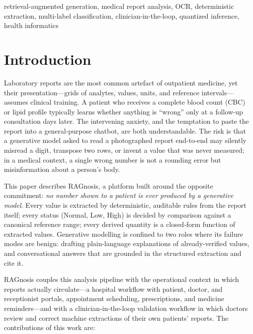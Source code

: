 \documentclass[conference]{IEEEtran}
\begin{document}
\begin{IEEEkeywords}
retrieval-augmented generation, medical report analysis, OCR,
deterministic extraction, multi-label classification, clinician-in-the-loop,
quantized inference, health informatics
\end{IEEEkeywords}

\section{Introduction}
Laboratory reports are the most common artefact of outpatient medicine,
yet their presentation---grids of analytes, values, units, and reference
intervals---assumes clinical training. A patient who receives a complete
blood count (CBC) or lipid profile typically learns whether anything is
``wrong'' only at a follow-up consultation days later. The intervening
anxiety, and the temptation to paste the report into a general-purpose
chatbot, are both understandable. The risk is that a generative model
asked to read a photographed report end-to-end may silently misread a
digit, transpose two rows, or invent a value that was never measured;
in a medical context, a single wrong number is not a rounding error but
misinformation about a person's body.

This paper describes RAGnosis, a platform built around the opposite
commitment: \emph{no number shown to a patient is ever produced by a
generative model}. Every value is extracted by deterministic,
auditable rules from the report itself; every status (Normal, Low,
High) is decided by comparison against a canonical reference range;
every derived quantity is a closed-form function of extracted values.
Generative modelling is confined to two roles where its failure modes
are benign: drafting plain-language explanations of already-verified
values, and conversational answers that are grounded in the structured
extraction and cite it.

RAGnosis couples this analysis pipeline with the operational context in
which reports actually circulate---a hospital workflow with patient,
doctor, and receptionist portals, appointment scheduling, prescriptions,
and medicine reminders---and with a clinician-in-the-loop validation
workflow in which doctors review and correct machine extractions of
their own patients' reports. The contributions of this work are:
\end{document}
